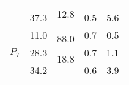 \documentclass[11p]{article}
\begin{document}
\begin{tabular}{|c|c|c|c|c|}
 & & \multirow{2}{*}{12.8} & & \\ \cline{2-2} \cline{4-5} 
 & \multirow{2}{*}{37.3} & & \multirow{2}{*}{0.5} & \multirow{2}{*}{5.6} \\ %
 & & & & \\ \hline \hline
\multirow{6}{*}{$P_7$} & \multirow{2}{*}{11.0} & & \multirow{2}{*}{0.7} & \multirow{2}{*}{0.5} \\ %
 & & \multirow{2}{*}{88.0} & & \\ \cline{2-2} \cline{4-5} 
 & \multirow{2}{*}{28.3} & & \multirow{2}{*}{0.7} & \multirow{2}{*}{1.1} \\ \cline{3-3}
 & & \multirow{2}{*}{18.8} & & \\ \cline{2-2} \cline{4-5} 
 & \multirow{2}{*}{34.2} & & \multirow{2}{*}{0.6} & \multirow{2}{*}{3.9} \\ %
 &  & & & \\ \hline
\end{tabular}
\end{document}
